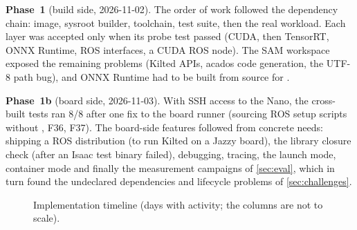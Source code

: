 \documentclass[11pt,a4paper]{article}
\newcommand{\finding}[1]{\textsf{\small F#1}}
\begin{document}
\textbf{Phase~1} (build side, 2026-11-02). The order of work followed the dependency chain: image, sysroot builder,
toolchain, test suite, then the real workload. Each layer was accepted only when its probe test passed (CUDA, then
TensorRT, ONNX Runtime, ROS interfaces, a CUDA ROS node). The SAM workspace exposed the remaining problems (Kilted APIs,
acados code generation, the UTF-8 path bug), and ONNX Runtime had to be built from source for .

\textbf{Phase~1b} (board side, 2026-11-03). With SSH access to the Nano, the cross-built tests ran 8/8 after one fix to
the board runner (sourcing ROS setup scripts without , \finding{36}, \finding{37}). The board-side features
followed from concrete needs: shipping a ROS distribution (to run Kilted on a Jazzy board), the library closure check
(after an Isaac test binary failed), debugging, tracing, the launch mode, container mode and finally the measurement
campaigns of \cref{sec:eval}, which in turn found the undeclared dependencies and lifecycle problems of
\cref{sec:challenges}.

\begin{figure}[H]
\centering
{}
\caption{Implementation timeline (days with activity; the columns are not to scale).}\label{fig:timeline}
\end{figure}
\end{document}
